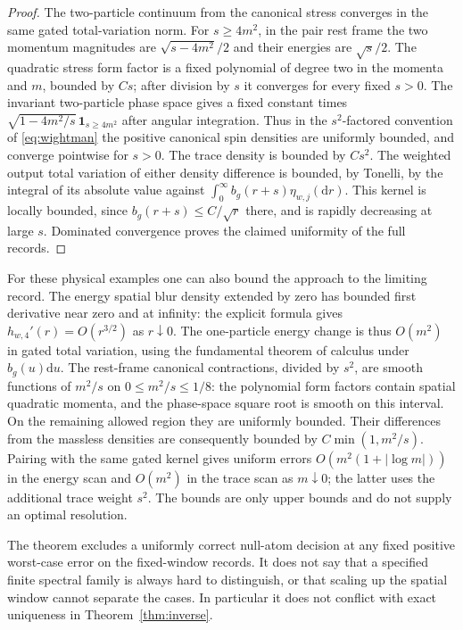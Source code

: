 \documentclass[11pt]{article}
\theoremstyle{remark}
\newcommand{\dd}{\mathrm d}
\begin{document}
\begin{proof}
The two-particle continuum from the canonical stress converges
in the same gated total-variation norm. For \(s\ge4m^2\), in the
pair rest frame the two momentum magnitudes are
\(\sqrt{s-4m^2}/2\) and their energies are \(\sqrt s/2\).
The quadratic stress form factor is a fixed polynomial of
degree two in the momenta and \(m\), bounded by \(Cs\);
after division by \(s\) it converges for every fixed \(s>0\).
The invariant two-particle phase space gives a fixed constant times
\(\sqrt{1-4m^2/s}\,\mathbf1_{s\ge4m^2}\) after angular integration.
Thus in the \(s^2\)-factored convention of
\eqref{eq:wightman} the positive canonical spin densities
are uniformly bounded, and converge pointwise for \(s>0\).
The trace density is bounded by \(Cs^2\). The weighted output
total variation of either density difference is bounded, by
Tonelli, by the integral of its absolute value against
\(\int_0^\infty b_g(r+s)\eta_{w,j}(\dd r)\).
This kernel is locally bounded, since
\(b_g(r+s)\le C/\sqrt{r}\) there, and is rapidly decreasing
at large \(s\). Dominated convergence proves the claimed
uniformity of the full records.
\end{proof}

For these physical examples one can also bound the approach
to the limiting record. The energy spatial blur density
extended by zero has bounded first derivative near zero
and at infinity: the explicit formula gives
\(h_{w,4}'(r)=O(r^{3/2})\) as \(r\downarrow0\).
The one-particle energy change is thus
\(O(m^2)\) in gated total variation, using the fundamental
theorem of calculus under \(b_g(u)\dd u\). The rest-frame
canonical contractions, divided by \(s^2\), are smooth
functions of \(m^2/s\) on \(0\le m^2/s\le1/8\): the
polynomial form factors contain spatial quadratic
momenta, and the phase-space square root is smooth on
this interval. On the remaining allowed region they
are uniformly bounded. Their differences from the
massless densities are consequently bounded by
\(C\min(1,m^2/s)\). Pairing with the same gated kernel gives
uniform errors \(O(m^2(1+|\log m|))\) in the energy scan
and \(O(m^2)\) in the trace scan as \(m\downarrow0\); the latter
uses the additional trace weight \(s^2\). The bounds are
only upper bounds and do not supply an optimal resolution.

The theorem excludes a uniformly correct null-atom decision
at any fixed positive worst-case error on the fixed-window
records. It does not say that a specified finite spectral family
is always hard to distinguish, or that scaling up the spatial
window cannot separate the cases. In particular it does not
conflict with exact uniqueness in Theorem~\ref{thm:inverse}.
\end{document}
